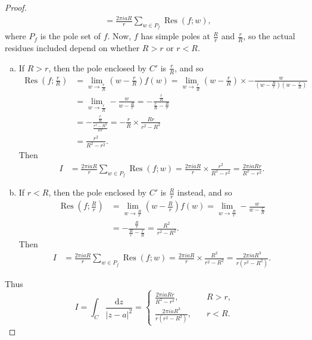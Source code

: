 \documentclass[12pt]{article}
\newcommand\paren[1]{\left( #1 \right)}
\newcommand{\abs}[1]{\left| #1 \right|}
\theoremstyle{definition}
\DeclareMathOperator\Res{Res}
\begin{document}
\begin{enumerate}
\begin{proof}
\begin{align*}
            & = \frac{2\pi i a R}{r} \sum\limits_{w \in P_f} \Res \paren{ f ; w } , 
        \end{align*}
        where $P_f$ is the pole set of $f$. Now, $f$ has simple poles at $\frac{R}{r}$ and $\frac{r}{R}$, so the actual residues included depend on whether $R > r$ or $r < R$.
        \begin{enumerate}[(a)]
            \item If $R > r$, then the pole enclosed by $C'$ is $\frac{r}{R}$, and so 
            \begin{align*}
                \Res \paren{ f ; \frac{r}{R} } & = \lim\limits_{w \to \frac{r}{R}} \paren{ w - \frac{r}{R} } f(w) = \lim\limits_{w \to \frac{r}{R}} \paren{ w - \frac{r}{R} } \times -\frac{w}{ \paren{ w - \frac{R}{r} } \paren{ w - \frac{r}{R} } } \\ 
                & = \lim\limits_{w \to \frac{r}{R}} - \frac{w}{w - \frac{R}{r}} = - \frac{ \frac{r}{R} }{ \frac{r}{R} - \frac{R}{r} } \\ & = - \frac{ \frac{r}{R} }{ \frac{r^2 - R^2}{Rr} } = - \frac{r}{R} \times \frac{Rr}{r^2 - R^2} \\ 
                & = \frac{r^2}{R^2-r^2}.
            \end{align*}
            Then 
            \begin{align*}
                I & = \frac{2\pi i a R}{r} \sum\limits_{w \in P_f} \Res \paren{ f ; w } = \frac{2\pi i a R}{r} \times \frac{r^2}{R^2-r^2} = \frac{2\pi i a R r}{R^2 - r^2}.
            \end{align*}
            \item If $r < R$, then the pole enclosed by $C'$ is $\frac{R}{r}$ instead, and so 
            \begin{align*}
                \Res \paren{ f ; \frac{R}{r} } & = \lim\limits_{w \to \frac{R}{r}} \paren{ w - \frac{R}{r} } f(w) = \lim\limits_{w \to \frac{R}{r}} -\frac{w}{w - \frac{r}{R}} \\ 
                & = -\frac{ \frac{R}{r} }{ \frac{R}{r} - \frac{r}{R} } = \frac{R^2}{r^2 - R^2}.
            \end{align*}
            Then 
            \begin{align*}
                I & = \frac{2\pi i a R}{r} \sum\limits_{w \in P_f} \Res \paren{ f ; w } = \frac{2\pi i a R}{r} \times \frac{R^2}{r^2-R^2} = \frac{2\pi i a R^3}{r \paren{ r^2 - R^2 } }.
            \end{align*}
        \end{enumerate}
        Thus 
        \[
            I = \int_C \frac{\mathrm{d}z}{\abs{z-a}^2} = 
            \begin{cases}
                \frac{2\pi i a R r}{R^2 - r^2} , & \quad R > r , \\[10pt]
                \frac{2\pi i a R^3}{r \paren{ r^2 - R^2 } } , & \quad r < R.
            \end{cases}
        \]
    \end{proof}
\end{enumerate}
\end{document}
